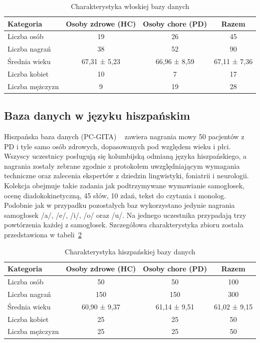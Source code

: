 \begin{table}[h]
\centering
\caption{Charakterystyka włoskiej bazy danych}
\label{tab:italian-database}
\begin{tabular}{|l|c|c|c|}
\hline
\textbf{Kategoria} &\textbf{Osoby zdrowe (HC)} &\textbf{Osoby chore (PD)} &\textbf{Razem} \\ \hline
Liczba osób &19 &26 &45\\ \hline
Liczba nagrań &38 &52 &90\\ \hline
Średnia wieku &67,31 ± 5,23 &66,96 ± 8,59  & 67,11 ± 7,36 \\ \hline
Liczba kobiet &10 &7 &17\\ \hline
Liczba mężczyzn &9 &19 &28 \\ \hline
\end{tabular}
\end{table}


\subsection{Baza danych w języku hiszpańskim}
\label{subsec:hiszpanska-baza}


Hiszpańska baza danych (PC-GITA) ~\cite{pc-gita} zawiera nagrania mowy 50 pacjentów z PD i tyle samo osób zdrowych, dopasowanych pod względem wieku i płci.
Wszyscy uczestnicy posługują się kolumbijską odmianą języka hiszpańskiego, a nagrania zostały zebrane zgodnie z protokołem uwzględniającym wymagania techniczne oraz zalecenia ekspertów z dziedzin lingwistyki, foniatrii i neurologii.
Kolekcja obejmuje takie zadania jak podtrzymywane wymawianie samogłosek, ocenę diadokokinetyczną, 45 słów, 10 zdań, tekst do czytania i monolog.
Podobnie jak w przypadku pozostałych baz wykorzystano jedynie nagrania samogłosek /a/, /e/, /i/, /o/ oraz /u/.
Na jednego uczestnika przypadają trzy powtórzenia każdej z samogłosek.
Szczegółowa charakterystyka zbioru została przedstawiona w tabeli~\ref{tab:spanish-database}

\begin{table}[ht]
\centering
\caption{Charakterystyka hiszpańskiej bazy danych}
\label{tab:spanish-database}
\begin{tabular}{|l|c|c|c|}
\hline
\textbf{Kategoria} &\textbf{Osoby zdrowe (HC)} &\textbf{Osoby chore (PD)} &\textbf{Razem} \\ \hline
Liczba osób &50 &50 &100\\ \hline
Liczba nagrań &150 &150 &300\\ \hline
Średnia wieku &60,90 ± 9,37 &61,14 ± 9,51  &61,02 ± 9,15\\ \hline
Liczba kobiet &25 &25 &50\\ \hline
Liczba mężczyzn &25 &25 &50 \\ \hline
\end{tabular}
\end{table}

